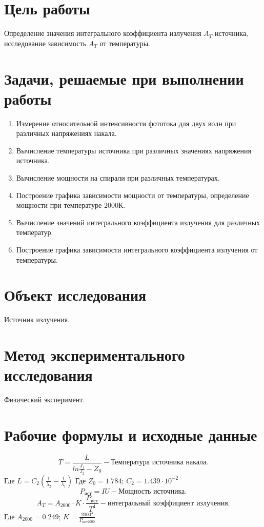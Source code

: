 \documentclass{article}
\begin{document}
\section{Цель работы}
\begin{enumerate}
     Определение значения интегрального коэффициента излучения $A_T$ источника, исследование зависимость $A_T$ от температуры.
\end{enumerate}

\section{Задачи, решаемые при выполнении работы}
\begin{enumerate}
    \item Измерение относительной интенсивности фототока для двух волн при различных напряжениях накала.
    \item Вычисление температуры источника при различных значениях напряжения источника.
    \item Вычисление мощности на спирали при различных температурах.
    \item Построение графика зависимости мощности от температуры, определение мощности при температуре 2000К.
    \item Вычисление значений интегрального коэффициента излучения для различных температур.
    \item Построение графика зависимости интегрального коэффициента излучения от температуры.
\end{enumerate}

\section{Объект исследования}
Источник излучения.
\section{Метод экспериментального исследования}
Физический эксперимент.
\section{Рабочие формулы и исходные данные}
\begin{equation}
 T=\frac{L}{ln\frac{J_1}{J_2}-Z_0} - \textit{Температура источника накала.}
 \label{eq:ref1}
\end{equation}
Где $L=C_2(\frac{1}{\lambda_2}-\frac{1}{\lambda_1})$
Где $Z_0 = 1.784$; $C_2=1.439\cdot 10^{-2}$
\begin{equation}
 P_{\textit{ист}}=IU - \textit{Мощность источника.}
 \label{eq:ref2}
\end{equation}
\begin{equation}
 A_T= A_{2000}\cdot K \cdot \frac{P_{\textit{ист}}}{T^4} - \textit{интегральный коэффициент излучения.}
 \label{eq:ref3}
\end{equation}
Где $A_{2000}=0.249$; $K=\frac{2000^4}{P_{\textit{ист}2000}}$
\newpage
\end{document}
